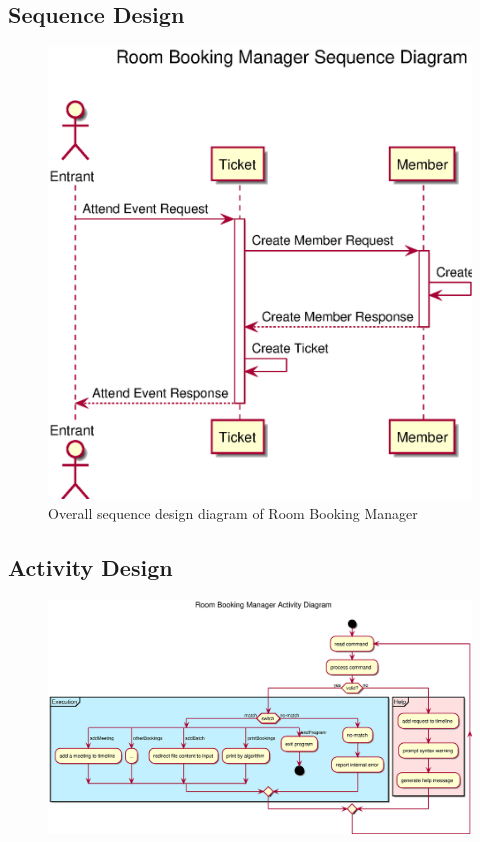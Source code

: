 \documentclass{article}
\begin{document}
        \subsection{Sequence Design}
            \begin{figure}[!htbp]
                \centering
                \includegraphics[scale=0.5]{img/eps/sequence_diagram.eps}
                \caption{Overall sequence design diagram of Room Booking Manager}
            \end{figure}
        \subsection{Activity Design}
            \begin{figure}[!htbp]
                \centering
                \includegraphics[scale=0.45]{img/eps/activity_diagram.eps}
            \end{figure}
\end{document}
